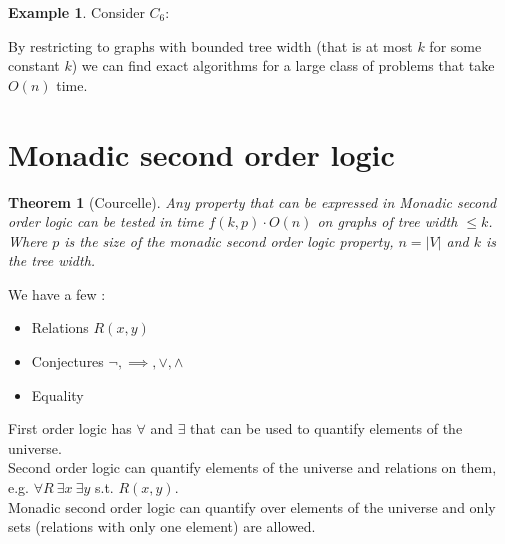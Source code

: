 \documentclass{article}
\newtheorem*{thm}{Theorem}
\theoremstyle{definition}
\newtheorem*{ex}{Example}
\begin{document}
\begin{ex}
Consider $C_6$:
\begin{center}
\end{center}
\end{ex}

By restricting to graphs with bounded tree width (that is at most $k$ for some constant $k$) we can find exact algorithms for a large class of problems that take $O(n)$ time.


\section{Monadic second order logic}

\begin{thm}[Courcelle]
Any property that can be expressed in Monadic second order logic can be tested in time $f(k,p)\cdot O(n)$ on graphs of tree width $\le k$.
Where $p$ is the size of the monadic second order logic property, $n = |V|$ and $k$ is the tree width.
\end{thm}

We have a few :
\begin{itemize}
\item Relations $R(x,y)$
\item Conjectures $\neg,\implies,\vee,\wedge$
\item Equality
\end{itemize}

First order logic has $\forall$ and $\exists$ that can be used to quantify elements of the universe.\\
Second order logic can quantify elements of the universe and relations on them, e.g. $\forall R\ \exists x\ \exists y$ s.t. $R(x,y)$. \\
Monadic second order logic can quantify over elements of the universe and only sets (relations with only one element) are allowed.

\end{document}
